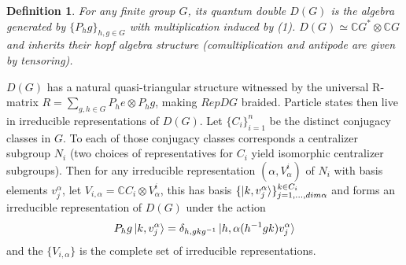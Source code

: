 \documentclass{article}
\newtheorem{definition}{Definition}
\begin{document}
\begin{definition}
	For any finite group $G$, its quantum double $D(G)$ is the algebra generated by $\{P_hg\}_{h,g\in G}$ with multiplication induced by (1). $D(G) \simeq \mathbb{C}G^* \otimes \mathbb{C}G$ and inherits their hopf algebra structure (comultiplication and antipode are given by tensoring). 
\end{definition}
$D(G)$ has a natural quasi-triangular structure witnessed by the universal R-matrix $R=\sum_{g,h \in G}P_he \otimes P_hg$, making $RepDG$ braided. Particle states then live in irreducible representations of $D(G)$. Let $\{C_i\}_{i=1}^n$ be the distinct conjugacy classes in $G$. To each of those conjugacy classes corresponds a centralizer subgroup $N_i$ (two choices of representatives for $C_i$ yield isomorphic centralizer subgroups). Then for any irreducible representation $(\alpha,V^i_\alpha)$ of $N_i$ with basis elements $v^\alpha_j$, let $V_{i,\alpha} = \mathbb{C}C_i \otimes V^i_\alpha$, this has basis $\{ \ket{k,v^\alpha_j} \}_{j=1,...,dim\alpha}^{k\in C_i}$ and forms an irreducible representation of $D(G)$ under the action 
\begin{equation}
P_hg\ket{k,v^\alpha_j} = \delta_{h,gkg^{-1}} \ket{h,\alpha(h^{-1}gk)v^\alpha_j}
\end{equation}
and the $\{V_{i,\alpha}\}$ is the complete set of irreducible representations.

\end{document}
